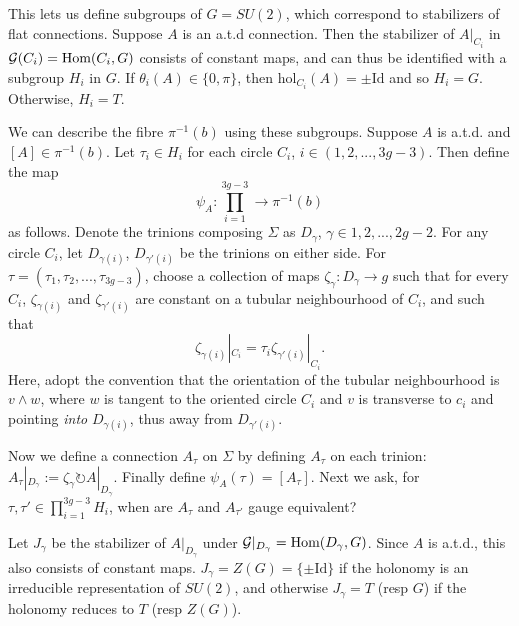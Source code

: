 	This lets us define subgroups of $G=SU(2)$, which correspond to stabilizers of flat connections. Suppose $A$ is an a.t.d connection. Then the stabilizer of $A|_{C_i}$ in $\mathcal{G}(C_i) = \text{Hom}(C_i, G)$ consists of constant maps, and can thus be identified with a subgroup $H_i$ in $G$. If $\theta_i(A) \in \{0,\pi\}$, then $\text{hol}_{C_i}(A) = \pm\text{Id}$ and so $H_i = G$. Otherwise, $H_i = T$. 
	
	We can describe the fibre $\pi^{-1}(b)$ using these subgroups. Suppose $A$ is a.t.d. and $[A] \in \pi^{-1}(b)$. Let $\tau_i \in H_i$ for each circle $C_i$, $i\in (1,2,...,3g-3)$. Then define the map
	\begin{equation}
		\label{e:psiA}
		\psi_A : \prod_{i=1}^{3g-3} \to \pi^{-1}(b)
	\end{equation}
	as follows. Denote the trinions composing $\Sigma$ as $D_{\gamma}$, $\gamma\in{1,2,...,2g-2}$. For any circle $C_i$, let $D_{\gamma(i)}$, $D_{\gamma'(i)}$ be the trinions on either side. For $\tau=(\tau_1,\tau_2,...,\tau_{3g-3})$, choose a collection of maps $\zeta_\gamma : D_\gamma \to g$ such that for every $C_i$, $\zeta_{\gamma(i)}$ and $\zeta_{\gamma'(i)}$ are constant on a tubular neighbourhood of $C_i$, and such that
	\begin{equation}
		\zeta_{\gamma(i)}|_{C_i} = \tau_i \zeta_{\gamma'(i)}|_{C_i}.
	\end{equation}
	Here, adopt the convention that the orientation of the tubular neighbourhood is $v\wedge w$, where $w$ is tangent to the oriented circle $C_i$ and $v$ is transverse to $c_i$ and pointing \textit{into} $D_{\gamma(i)}$, thus away from $D_{\gamma'(i)}$.
	
	Now we define a connection $A_\tau$ on $\Sigma$ by defining $A_\tau$ on each trinion: $A_\tau|_{D_\gamma} := \zeta_\gamma \circlearrowright A|_{D_\gamma}$. Finally define $\psi_A(\tau) = [A_\tau]$. Next we ask, for $\tau,\tau' \in \prod_{i=1}^{3g-3} H_i$, when are $A_\tau$ and $A_{\tau'}$ gauge equivalent? 
	
	Let $J_\gamma$ be the stabilizer of $A|_{D_\gamma}$ under $\mathcal{G}|_{D_\gamma} = \text{Hom}(D_\gamma,G)$. Since $A$ is a.t.d., this also consists of constant maps. $J_\gamma = Z(G) = \{\pm \text{Id}\}$ if the holonomy is an irreducible representation of $SU(2)$, and otherwise $J_\gamma =T$ (resp $G$) if the holonomy reduces to $T$ (resp $Z(G)$).  
	
